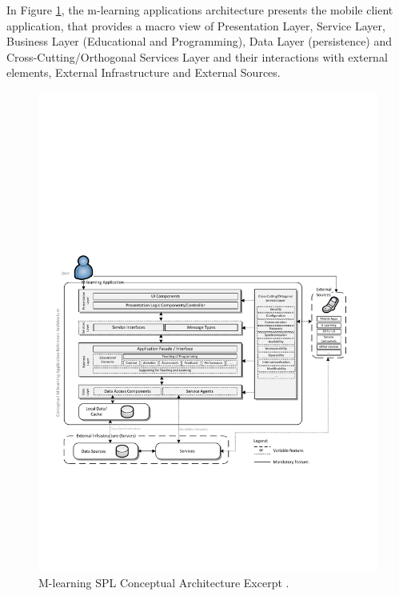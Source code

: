 

In Figure \ref{fig:schema}, the m-learning applications architecture presents the mobile client application, that provides a macro view of Presentation Layer, Service Layer, Business Layer (Educational and Programming), Data Layer (persistence) and Cross-Cutting/Orthogonal Services Layer and their interactions with external elements, External Infrastructure and External Sources.

\begin{figure}[!ht]
    \centering
    \includegraphics[scale=0.75]{conceptual_old.pdf}
    \caption{M-learning SPL Conceptual Architecture Excerpt \cite{marcolinoarcht2017}.}
    \label{fig:schema}
\end{figure}

